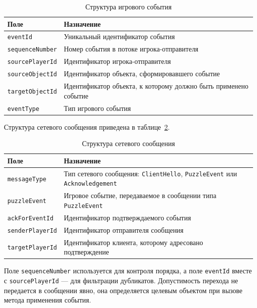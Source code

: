 \begin{table}[H]
	\caption{Структура игрового события}
	\label{tab:event-fields}
	\centering
	\renewcommand{\arraystretch}{1.2}
	\begin{tabular}{|p{4.5cm}|p{9.5cm}|}
		\hline
		Поле & Назначение \\ \hline
		\texttt{eventId} & Уникальный идентификатор события \\ \hline
		\texttt{sequenceNumber} & Номер события в потоке игрока-отправителя \\ \hline
		\texttt{sourcePlayerId} & Идентификатор игрока-отправителя \\ \hline
		\texttt{sourceObjectId} & Идентификатор объекта, сформировавшего событие \\ \hline
		\texttt{targetObjectId} & Идентификатор объекта, к которому должно быть применено событие \\ \hline
		\texttt{eventType} & Тип игрового события \\ \hline
	\end{tabular}
\end{table}

Структура сетевого сообщения приведена в таблице~\ref{tab:message-fields}.

\begin{table}[H]
	\caption{Структура сетевого сообщения}
	\label{tab:message-fields}
	\centering
	\renewcommand{\arraystretch}{1.2}
	\begin{tabular}{|p{4.5cm}|p{9.5cm}|}
		\hline
		Поле & Назначение \\ \hline
		\texttt{messageType} & Тип сетевого сообщения: \texttt{ClientHello}, \texttt{PuzzleEvent} или \texttt{Acknowledgement} \\ \hline
		\texttt{puzzleEvent} & Игровое событие, передаваемое в сообщении типа \texttt{PuzzleEvent} \\ \hline
		\texttt{ackForEventId} & Идентификатор подтверждаемого события \\ \hline
		\texttt{senderPlayerId} & Идентификатор отправителя сообщения \\ \hline
		\texttt{targetPlayerId} & Идентификатор клиента, которому адресовано подтверждение \\ \hline
	\end{tabular}
\end{table}

Поле \texttt{sequenceNumber} используется для контроля порядка, а поле \texttt{eventId} вместе с \texttt{sourcePlayerId} --- для фильтрации дубликатов. Допустимость перехода не передается в сообщении явно, 
она определяется целевым объектом при вызове метода применения события.


